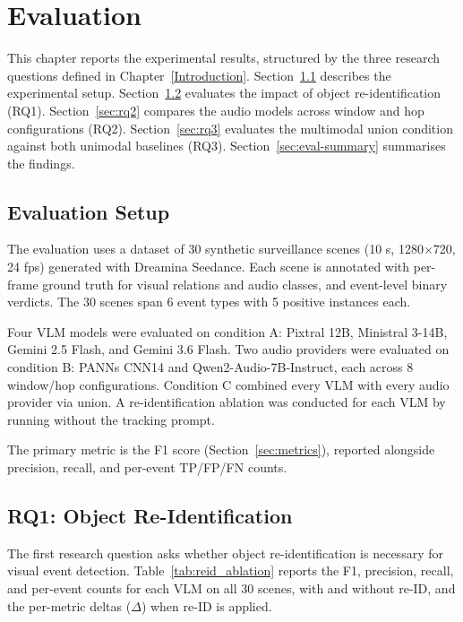\chapter{Evaluation}
\label{Evaluation}

This chapter reports the experimental results, structured by the three research questions defined in Chapter~\ref{Introduction}. Section~\ref{sec:eval-setup} describes the experimental setup. Section~\ref{sec:rq1} evaluates the impact of object re-identification (RQ1). Section~\ref{sec:rq2} compares the audio models across window and hop configurations (RQ2). Section~\ref{sec:rq3} evaluates the multimodal union condition against both unimodal baselines (RQ3). Section~\ref{sec:eval-summary} summarises the findings.

\section{Evaluation Setup}
\label{sec:eval-setup}

The evaluation uses a dataset of 30 synthetic surveillance scenes (10 s, 1280$\times$720, 24 fps) generated with Dreamina Seedance. Each scene is annotated with per-frame ground truth for visual relations and audio classes, and event-level binary verdicts. The 30 scenes span 6 event types with 5 positive instances each.

Four VLM models were evaluated on condition A: Pixtral 12B, Ministral 3-14B, Gemini 2.5 Flash, and Gemini 3.6 Flash. Two audio providers were evaluated on condition B: PANNs CNN14 and Qwen2-Audio-7B-Instruct, each across 8 window/hop configurations. Condition C combined every VLM with every audio provider via union. A re-identification ablation was conducted for each VLM by running without the tracking prompt.

The primary metric is the F1 score (Section~\ref{sec:metrics}), reported alongside precision, recall, and per-event TP/FP/FN counts.

\section{RQ1: Object Re-Identification}
\label{sec:rq1}

The first research question asks whether object re-identification is necessary for visual event detection. Table~\ref{tab:reid_ablation} reports the F1, precision, recall, and per-event counts for each VLM on all 30 scenes, with and without re-ID, and the per-metric deltas ($\Delta$) when re-ID is applied.

